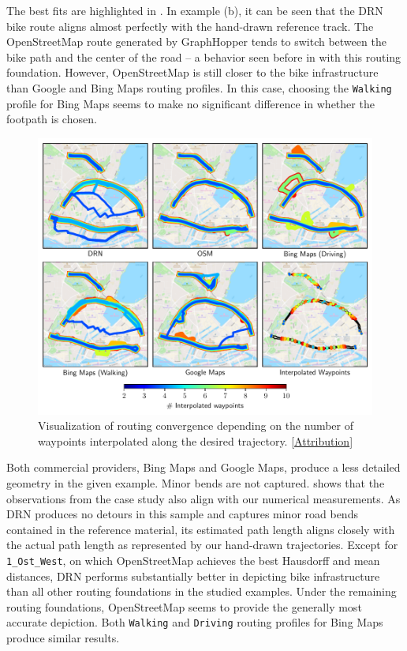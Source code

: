 The best fits are highlighted in . In example (b), it can be seen that the DRN bike route aligns almost perfectly with the hand-drawn reference track. The OpenStreetMap route generated by GraphHopper tends to switch between the bike path and the center of the road -- a behavior seen before in  with this routing foundation. However, OpenStreetMap is still closer to the bike infrastructure than Google and Bing Maps routing profiles. In this case, choosing the \texttt{Walking} profile for Bing Maps seems to make no significant difference in whether the footpath is chosen.

\begin{figure}[t]
\centering 
\includegraphics[width=\linewidth]{images/routing-convergence-process.pdf}
\caption{Visualization of routing convergence depending on the number of waypoints interpolated along the desired trajectory. [\hyperref[attribution]{Attribution}]}
\label{fig:routing-convergence-process}
\end{figure}

Both commercial providers, Bing Maps and Google Maps, produce a less detailed geometry in the given example. Minor bends are not captured.  shows that the observations from the case study also align with our numerical measurements. As DRN produces no detours in this sample and captures minor road bends contained in the reference material, its estimated path length aligns closely with the actual path length as represented by our hand-drawn trajectories. Except for \texttt{1\_Ost\_West}, on which OpenStreetMap achieves the best Hausdorff and mean distances, DRN performs substantially better in depicting bike infrastructure than all other routing foundations in the studied examples. Under the remaining routing foundations, OpenStreetMap seems to provide the generally most accurate depiction. Both \texttt{Walking} and \texttt{Driving} routing profiles for Bing Maps produce similar results.

